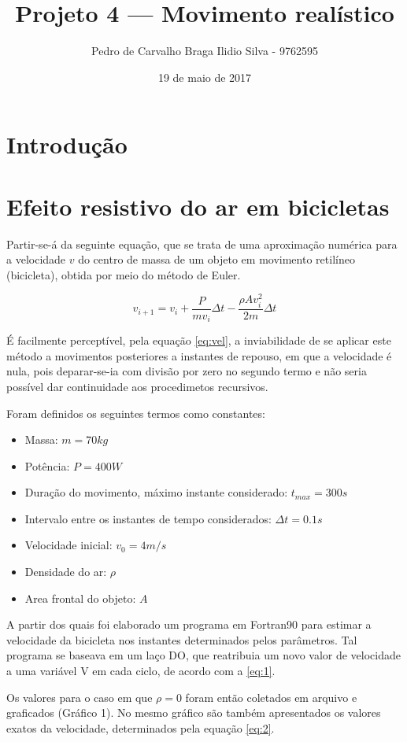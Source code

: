 \documentclass{article}
\author{Pedro de Carvalho Braga Ilidio Silva - 9762595}
\title{Projeto 4 — Movimento realístico}
\date{19 de maio de 2017}
\begin{document}
\maketitle
\section{Introdução}

\section{Efeito resistivo do ar em bicicletas}

Partir-se-á da seguinte equação, que se trata de uma aproximação numérica para a velocidade \(v\) do centro de massa de um objeto em movimento retilíneo (bicicleta), obtida por meio do método de Euler.

\begin{equation}
  \label{eq:vel}
  v_{i+1} = v_i + \frac{P}{mv_i} \Delta t -\frac{\rho Av^2_i}{2m} \Delta t
\end{equation}

É facilmente perceptível, pela equação \ref{eq:vel}, a inviabilidade de se aplicar este método a movimentos posteriores a instantes de repouso, em que a velocidade é nula, pois deparar-se-ia com divisão por zero no segundo termo e não seria possível dar continuidade aos procedimetos recursivos.\par
Foram definidos os seguintes termos como constantes:

\begin{itemize}
\item Massa: \(m = 70 kg\)
\item Potência: \(P = 400 W\)
\item Duração do movimento, máximo instante considerado: \(t_{max}=300 s\)
\item Intervalo entre os instantes de tempo considerados: \(\Delta t = 0.1s\)
\item Velocidade inicial: \(v_0 = 4 m/s\)
\item Densidade do ar: \(\rho\)
\item Area frontal do objeto: \(A\)
\end{itemize}
A partir dos quais foi elaborado um programa em Fortran90 para estimar a velocidade da bicicleta nos instantes determinados pelos parâmetros. Tal programa se baseava em um laço DO, que reatribuia um novo valor de velocidade a uma variável V em cada ciclo, de acordo com a \ref{eq:1}.

Os valores para o caso em que \(\rho =0\) foram então coletados em arquivo e graficados (Gráfico 1). No mesmo gráfico são também apresentados os valores exatos da velocidade, determinados pela equação \ref{eq:2}. 
\end{document}
